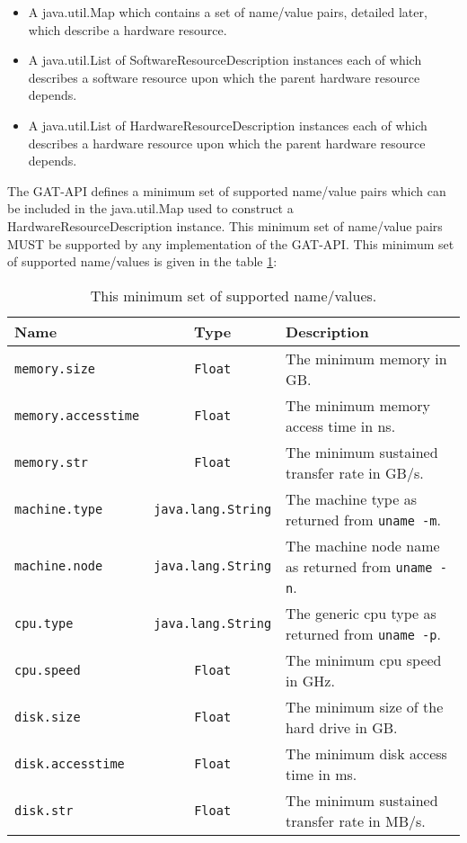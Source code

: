 \documentclass[$Date: 2003/06/26 19:29:31 $]{glabarticle}
\begin{document}
\begin{itemize}
  \item A java.util.Map which contains a set of name/value pairs, detailed later, which describe a hardware
   resource.
  \item A java.util.List of SoftwareResourceDescription instances each of which describes a software resource upon
  which the parent hardware resource depends.
  \item A java.util.List of HardwareResourceDescription instances each of which describes a hardware resource upon
  which the parent hardware resource depends.
\end{itemize}
The GAT-API defines a minimum set of supported name/value pairs which can be included in the java.util.Map
used to construct a HardwareResourceDescription instance. This minimum set of name/value pairs MUST 
be supported by any implementation of the GAT-API. This minimum set of supported name/values is given
in the table \ref{table:HRD}:
\begin{table}[htp]
\begin{center}
\begin{tabular}{|l|c|l|} \hline
Name & Type & Description \\ \hline\hline
\verb"memory.size" & \verb"Float" & The minimum memory in GB. \\ \hline
\verb"memory.accesstime" & \verb"Float" & The minimum memory access time in ns. \\ \hline
\verb"memory.str" & \verb"Float" & The minimum sustained transfer rate in GB/s. \\ \hline
\verb"machine.type" & \verb"java.lang.String" & The machine type as returned from \texttt{uname -m}. \\ \hline
\verb"machine.node" & \verb"java.lang.String" & The machine node name as returned from \texttt{uname -n}. \\ \hline
\verb"cpu.type" & \verb"java.lang.String" & The generic cpu type as returned from \texttt{uname -p}. \\ \hline
\verb"cpu.speed" & \verb"Float" & The minimum cpu speed in GHz. \\ \hline
\verb"disk.size" & \verb"Float" & The minimum size of the hard drive in GB. \\ \hline
\verb"disk.accesstime" & \verb"Float" & The minimum disk access time in ms. \\ \hline
\verb"disk.str" & \verb"Float" & The minimum sustained transfer rate in MB/s. \\ \hline
\end{tabular}
\end{center}
\caption{This minimum set of supported name/values.}
\label{table:HRD}
\end{table}
\end{document}
